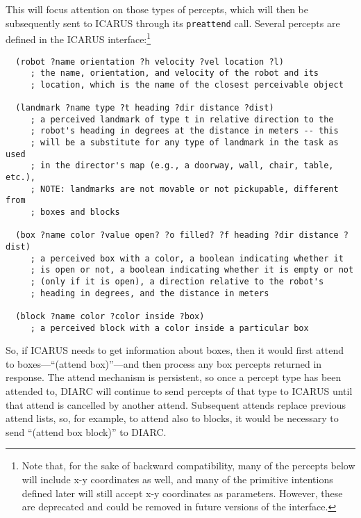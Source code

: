 \documentclass{article}
\begin{document}
\noindent This will focus attention on those types of percepts, which 
will then be subsequently sent to ICARUS through its {\tt preattend} 
call.  Several percepts are defined in the ICARUS 
interface:\footnote{Note that, for the sake of backward compatibility, 
many of the percepts below will include x-y coordinates as well, and 
many of the primitive intentions defined later will still accept x-y 
coordinates as parameters.  However, these are deprecated and could be 
removed in future versions of the interface.}


\begin{verbatim}
  (robot ?name orientation ?h velocity ?vel location ?l)
     ; the name, orientation, and velocity of the robot and its
     ; location, which is the name of the closest perceivable object

  (landmark ?name type ?t heading ?dir distance ?dist) 
     ; a perceived landmark of type t in relative direction to the 
     ; robot's heading in degrees at the distance in meters -- this
     ; will be a substitute for any type of landmark in the task as used
     ; in the director's map (e.g., a doorway, wall, chair, table, etc.),
     ; NOTE: landmarks are not movable or not pickupable, different from
     ; boxes and blocks

  (box ?name color ?value open? ?o filled? ?f heading ?dir distance ?dist)
     ; a perceived box with a color, a boolean indicating whether it
     ; is open or not, a boolean indicating whether it is empty or not
     ; (only if it is open), a direction relative to the robot's
     ; heading in degrees, and the distance in meters

  (block ?name color ?color inside ?box) 
     ; a perceived block with a color inside a particular box

\end{verbatim}

So, if ICARUS needs to get information about boxes, then it would
first attend to boxes---``(attend box)''---and then process any box
percepts returned in response.  The attend mechanism is persistent, so 
once a percept type has been attended to, DIARC will continue to send 
percepts of that type to ICARUS until that attend is cancelled by 
another attend.  Subsequent attends replace previous attend lists, so, 
for example, to attend also to blocks, it would be necessary to send 
``(attend box block)'' to DIARC.
\end{document}
